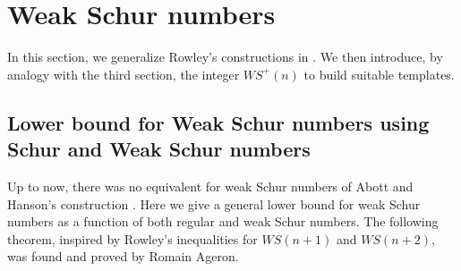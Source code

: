 \section{Weak Schur numbers}

In this section, we generalize Rowley's constructions in \cite{RowleyWS}. We then introduce, by analogy with the third
section, the
integer \(WS^+(n)\)
to build suitable templates.

\subsection{Lower bound for Weak Schur numbers using Schur and Weak Schur numbers}

Up to now, there was no equivalent for weak Schur numbers of Abott and Hanson's construction \cite{AbbottHanson}. Here
we
give a general lower bound for weak Schur numbers as a function of both regular and weak Schur numbers.
The following theorem, inspired by Rowley's inequalities for \(WS(n+1)\) and \(WS(n+2)\), was found and proved
by Romain Ageron.

